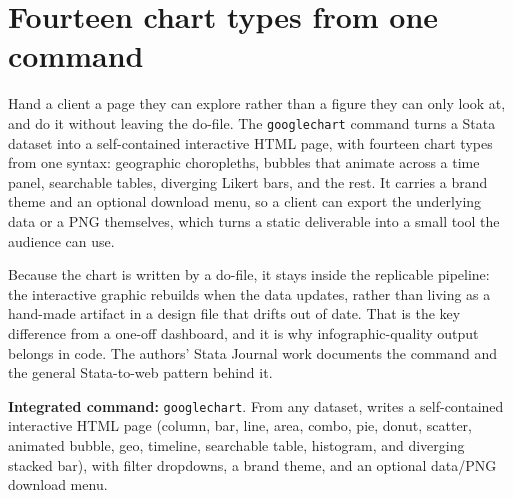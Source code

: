 \documentclass[
    a4paper,
    fontsize=10pt,
    twoside=true,
    numbers=noenddot,
]{kaobook}
\begin{document}
\section{Fourteen chart types from one command}
Hand a client a page they can explore rather than a figure they can only look at, and do it without leaving the do-file. The \texttt{googlechart} command turns a Stata dataset into a self-contained interactive HTML page, with fourteen chart types from one syntax: geographic choropleths, bubbles that animate across a time panel, searchable tables, diverging Likert bars, and the rest. It carries a brand theme and an optional download menu, so a client can export the underlying data or a PNG themselves, which turns a static deliverable into a small tool the audience can use.

Because the chart is written by a do-file, it stays inside the replicable pipeline: the interactive graphic rebuilds when the data updates, rather than living as a hand-made artifact in a design file that drifts out of date. That is the key difference from a one-off dashboard, and it is why infographic-quality output belongs in code. The authors' Stata Journal work documents the command and the general Stata-to-web pattern behind it.

\begin{kaobox}[frametitle=Package Integration: \texttt{googlechart}]
\textbf{Integrated command:} \texttt{googlechart}. From any dataset, writes a self-contained interactive HTML page (column, bar, line, area, combo, pie, donut, scatter, animated bubble, geo, timeline, searchable table, histogram, and diverging stacked bar), with filter dropdowns, a brand theme, and an optional data/PNG download menu.
\end{kaobox}
\end{document}
